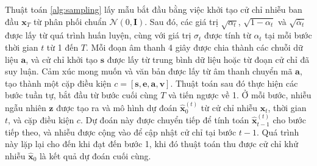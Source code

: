 Thuật toán \ref{alg:sampling} lấy mẫu bắt đầu bằng việc khởi tạo cử chỉ nhiễu ban đầu $\mathbf{x}_T$ từ phân phối chuẩn $\mathcal{N}(0, \mathbf{I})$. Sau đó, các giá trị $\sqrt{\alpha_t}$, $\sqrt{1 - \alpha_t}$ và $\sqrt{\bar{\alpha}_t}$ được lấy từ quá trình huấn luyện, cùng với giá trị $\sigma_t$ được tính từ $\alpha_t$ tại mỗi bước thời gian $t$ từ 1 đến $T$. Mỗi đoạn âm thanh 4 giây được chia thành các chuỗi dữ liệu $\mathbf{a}$, và cử chỉ khởi tạo $\mathbf{s}$ được lấy từ trung bình dữ liệu hoặc từ đoạn cử chỉ đã suy luận. Cảm xúc mong muốn và văn bản được lấy từ âm thanh chuyển mã $\mathbf{a}$, tạo thành một cặp điều kiện $c = [\mathbf{s}, \mathbf{e}, \mathbf{a}, \mathbf{v}]$. Thuật toán sau đó thực hiện các bước tuần tự, bắt đầu từ bước cuối cùng $T$ và tiến ngược về 1. Ở mỗi bước, nhiễu ngẫu nhiên $\mathbf{z}$ được tạo ra và mô hình dự đoán $\hat{\mathbf{x}}_0^{(t)}$ từ cử chỉ nhiễu $\mathbf{x}_t$, thời gian $t$, và cặp điều kiện $c$. Dự đoán này được chuyển tiếp để tính toán $\hat{\mathbf{x}}_{t-1}^{(t)}$ cho bước tiếp theo, và nhiễu được cộng vào để cập nhật cử chỉ tại bước $t-1$. Quá trình này lặp lại cho đến khi đạt đến bước 1, khi đó thuật toán thu được cử chỉ khử nhiễu $\hat{\mathbf{x}}_0$ là kết quả dự đoán cuối cùng.



